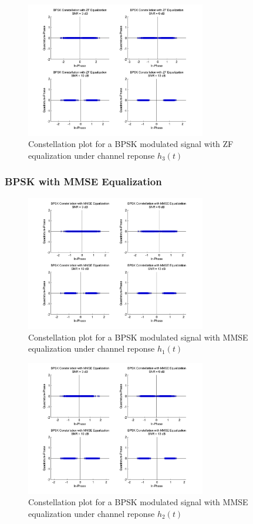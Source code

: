 \documentclass[]{article}
\begin{document}
\begin{figure}[H]
\centering
\includegraphics[width=0.7\textwidth]{bpConstZF3.jpg}
\caption{Constellation plot for a BPSK modulated signal with ZF equalization under channel reponse $h_3(t)$}
\end{figure}

\subsubsection{BPSK with MMSE Equalization}

\begin{figure}[H]
\centering
\includegraphics[width=0.7\textwidth]{bpConstMMSE1.jpg}
\caption{Constellation plot for a BPSK modulated signal with MMSE equalization under channel reponse $h_1(t)$}
\end{figure}

\begin{figure}[H]
\centering
\includegraphics[width=0.7\textwidth]{bpConstMMSE2.jpg}
\caption{Constellation plot for a BPSK modulated signal with MMSE equalization under channel reponse $h_2(t)$}
\end{figure}
\end{document}
